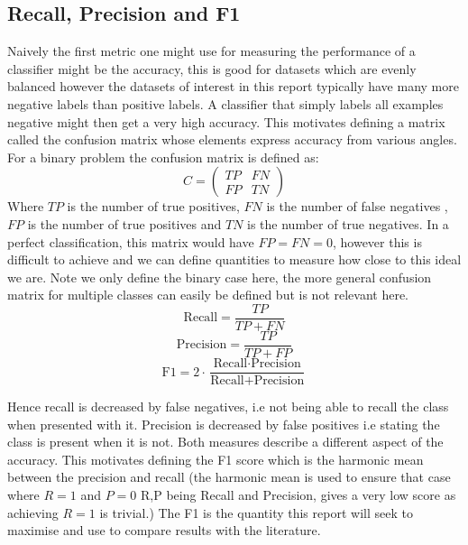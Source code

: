   \subsection{Recall, Precision and F1}
    Naively the first metric one might use for measuring the performance of a classifier
    might be the accuracy, this is good for datasets which are evenly balanced however
    the datasets of interest in this report typically have many more negative labels than positive labels.
    A classifier that simply labels all examples negative might then get a very high accuracy. This motivates
    defining a matrix called the confusion matrix whose elements express accuracy from various angles.
    For a binary problem the confusion matrix is defined as:
    \begin{equation}
      C =
      \begin{pmatrix}
        TP & FN\\
        FP & TN
      \end{pmatrix}
    \end{equation}
    Where $TP$ is the number of true positives, $FN$ is the number of false negatives
    , $FP$ is the number of true positives and $TN$ is the number of true negatives.
    In a perfect classification, this matrix would have $FP=FN=0$, however this is
    difficult to achieve
    and we can define quantities to measure how close to this ideal we are. Note we
    only define the binary case here, the more general confusion matrix for multiple
    classes can easily be defined but is not relevant here.
    \begin{equation}
      \text{Recall} = \frac{TP}{TP+FN}
    \end{equation}
    \begin{equation}
      \text{Precision} = \frac{TP}{TP+FP}
    \end{equation}
    \begin{equation}
      \text{F1} = 2 \cdot \frac{\text{Recall} \cdot \text{Precision}}{\text{Recall} + \text{Precision}}
    \end{equation}

    Hence recall is decreased by false negatives, i.e not being able to recall the class
    when presented with it. Precision is decreased by false positives i.e stating the class
    is present when it is not. Both measures describe a different aspect of the accuracy. This
    motivates defining the F1 score which is the harmonic mean between the precision and recall
    (the harmonic mean is used to ensure that case where $R=1$ and $P=0$ R,P being Recall and Precision, gives
    a very low score  as achieving $R=1$ is trivial.) The F1 is the quantity this report will seek to maximise and use to compare
    results with the literature.

